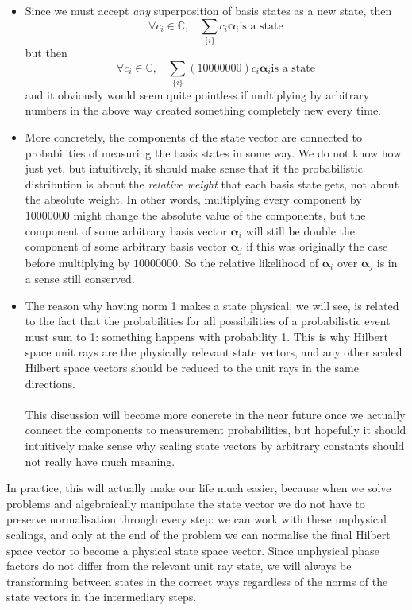\begin{itemize}
    \item Since we must accept \textit{any} superposition of basis states as a new state, then 
    $$
    \forall c_{i}\in \mathbb{C}, \:\:\:\: \sum_{\{i\}}c_{i}\bm{\alpha}_{i} \text{is a state}
    $$
    but then 
    $$
    \forall c_{i}\in \mathbb{C}, \:\:\:\: \sum_{\{i\}}(10000000)c_{i}\bm{\alpha}_{i} \text{is a state}
    $$
    and it obviously would seem quite pointless if multiplying by arbitrary numbers in the above way created something completely new every time.
    \item More concretely, the components of the state vector are connected to probabilities of measuring the basis states in some way. We do not know how just yet, but intuitively, it should make sense that it the probabilistic distribution is about the \textit{relative weight} that each basis state gets, not about the absolute weight. In other words, multiplying every component by $10000000$ might change the absolute value of the components, but the component of some arbitrary basis vector $\bm{\alpha}_{i}$ will still be double the component of some arbitrary basis vector $\bm{\alpha}_{j}$ if this was originally the case before multiplying by $10000000$. So the relative likelihood of $\bm{\alpha}_{i}$ over $\bm{\alpha}_{j}$ is in a sense still conserved. 
    \item The reason why having norm 1 makes a state physical, we will see, is related to the fact that the probabilities for all possibilities of a probabilistic event must sum to 1: something happens with probability 1. This is why Hilbert space unit rays are the physically relevant state vectors, and any other scaled Hilbert space vectors should be reduced to the unit rays in the same directions.
    \\\\
    This discussion will become more concrete in the near future once we actually connect the components to measurement probabilities, but hopefully it should intuitively make sense why scaling state vectors by arbitrary constants should not really have much meaning.
\end{itemize}
In practice, this will actually make our life much easier, because when we solve problems and algebraically manipulate the state vector we do not have to preserve normalisation through every step: we can work with these unphysical scalings, and only at the end of the problem we can normalise the final Hilbert space vector to become a physical state space vector. Since unphysical phase factors do not differ from the relevant unit ray state, we will always be transforming between states in the correct ways regardless of the norms of the state vectors in the intermediary steps.

